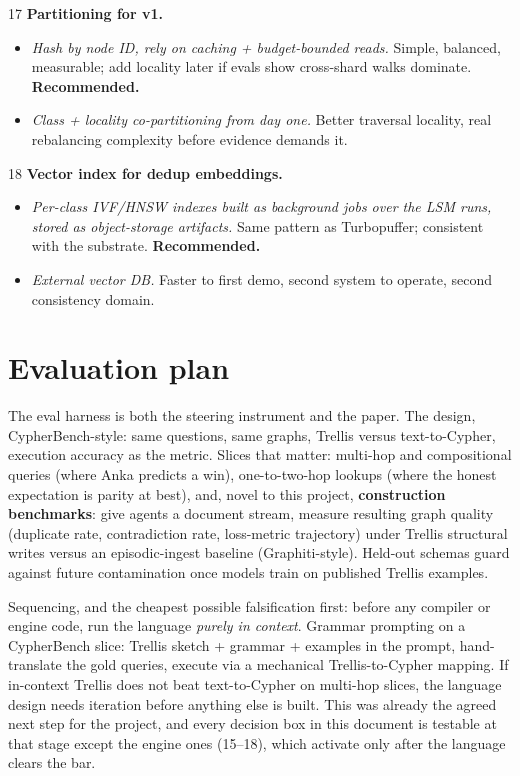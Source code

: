 \documentclass[11pt]{article}
\begin{document}
\begin{decisionbox}{17}
\textbf{Partitioning for v1.}
\begin{itemize}[leftmargin=1.4em,itemsep=1pt]
  \item[A.] \emph{Hash by node ID, rely on caching + budget-bounded reads.} Simple, balanced, measurable; add locality later if evals show cross-shard walks dominate. \textbf{Recommended.}
  \item[B.] \emph{Class + locality co-partitioning from day one.} Better traversal locality, real rebalancing complexity before evidence demands it.
\end{itemize}
\end{decisionbox}

\begin{decisionbox}{18}
\textbf{Vector index for dedup embeddings.}
\begin{itemize}[leftmargin=1.4em,itemsep=1pt]
  \item[A.] \emph{Per-class IVF/HNSW indexes built as background jobs over the LSM runs, stored as object-storage artifacts.} Same pattern as Turbopuffer; consistent with the substrate. \textbf{Recommended.}
  \item[B.] \emph{External vector DB.} Faster to first demo, second system to operate, second consistency domain.
\end{itemize}
\end{decisionbox}

\section{Evaluation plan}

The eval harness is both the steering instrument and the paper. The design, CypherBench-style: same questions, same graphs, Trellis versus text-to-Cypher, execution accuracy as the metric. Slices that matter: multi-hop and compositional queries (where Anka predicts a win), one-to-two-hop lookups (where the honest expectation is parity at best), and, novel to this project, \textbf{construction benchmarks}: give agents a document stream, measure resulting graph quality (duplicate rate, contradiction rate, loss-metric trajectory) under Trellis structural writes versus an episodic-ingest baseline (Graphiti-style). Held-out schemas guard against future contamination once models train on published Trellis examples.

Sequencing, and the cheapest possible falsification first: before any compiler or engine code, run the language \emph{purely in context}. Grammar prompting on a CypherBench slice: Trellis sketch + grammar + examples in the prompt, hand-translate the gold queries, execute via a mechanical Trellis-to-Cypher mapping. If in-context Trellis does not beat text-to-Cypher on multi-hop slices, the language design needs iteration before anything else is built. This was already the agreed next step for the project, and every decision box in this document is testable at that stage except the engine ones (15--18), which activate only after the language clears the bar.
\end{document}
